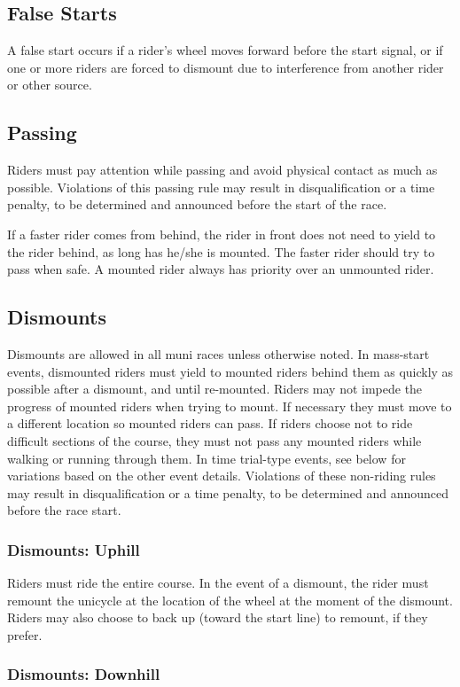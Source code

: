 \subsection{False Starts}
A false start occurs if a rider's wheel moves forward before the start signal, or if one or more riders are forced to dismount due to interference from another rider or other source.

\subsection{Passing}
Riders must pay attention while passing and avoid physical contact as much as possible.
Violations of this passing rule may result in disqualification or a time penalty, to be determined and announced before the start of the race.

If a faster rider comes from behind, the rider in front does not need to yield to the rider behind, as long has he/she is mounted.
The faster rider should try to pass when safe.
A mounted rider always has priority over an unmounted rider.

\subsection{Dismounts}
Dismounts are allowed in all muni races unless otherwise noted.
In mass-start events, dismounted riders must yield to mounted riders behind them as quickly as possible after a dismount, and until re-mounted.
Riders may not impede the progress of mounted riders when trying to mount.
If necessary they must move to a different location so mounted riders can pass.
If riders choose not to ride difficult sections of the course, they must not pass any mounted riders while walking or running through them.
In time trial-type events, see below for variations based on the other event details.
Violations of these non-riding rules may result in disqualification or a time penalty, to be determined and announced before the race start.

\subsubsection{Dismounts: Uphill}
Riders must ride the entire course.
In the event of a dismount, the rider must remount the unicycle at the location of the wheel at the moment of the dismount.
Riders may also choose to back up (toward the start line) to remount, if they prefer.

\subsubsection{Dismounts: Downhill}

